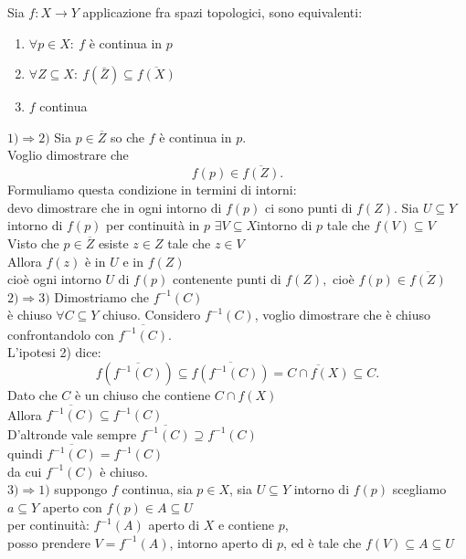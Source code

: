 \documentclass[12px]{article}
\begin{document}
	\begin{teo}
		Sia $f:X \rightarrow Y$ applicazione fra spazi topologici, sono equivalenti:
\begin{enumerate}
	\item $\forall p\in X:\  f$  è continua in $p$
	\item  $\forall Z\subseteq X: \ f(\bar Z)\subseteq \overline {f(X)}$  
	\item $f$ continua
\end{enumerate}
	\end{teo}
	\begin{dimo}
		$1) \Rightarrow 2)$ Sia $p\in \overline Z$ so che  $f$ è continua in $p$.\\
		Voglio dimostrare che 
		 \[
		 f(p)\in \overline{f(Z)}
		.\] 
		Formuliamo questa condizione in termini di intorni:\\
		devo dimostrare che in ogni intorno di $f(p)$ ci sono punti di  $f(Z)$. Sia $U\subseteq Y$ intorno di  $f(p)$ per continuità in $p$ $\exists V\subseteq X$intorno di  $p$ tale che $f(V)\subseteq V$ \\
		Visto che $p\in \overline Z$ esiste  $z\in Z$ tale che $z\in V$\\
		Allora  $f(z)$ è in $U$ e in $f(Z)$\\
		cioè ogni intorno $U$ di $f(p)$ contenente punti di $f(Z),$ cioè $f(p)\in \overline{f(Z)}$\\[10px]
		$2) \Rightarrow 3)$ Dimostriamo che $f^{-1}(C)$\\
		è chiuso  $\forall C\subseteq Y$ chiuso. Considero $f^{-1} (C)$, voglio dimostrare che è chiuso confrontandolo con  $\overline{f^{-1}(C)}$.\\
		L'ipotesi 2) dice:
		 \[
			 f(\overline{f^{-1}(C)})\subseteq\overline{f(f^{-1}(C))} = \overline{C\cap f(X)}\subseteq C
		.\] 
		Dato che $C$ è un chiuso che contiene $C\cap f(X)$\\
		Allora  $\overline{f^{-1}(C)}\subseteq f^{-1}(C)$\\
		D'altronde vale sempre  $\overline{f^{-1}(C)} \supseteq f^{-1}(C)$\\
		quindi  $\overline{f^{-1}(C)}= f^{-1}(C)$\\
		da cui  $f^{-1}(C)$ è chiuso.\\[10px]
		$3) \Rightarrow 1)$ suppongo $f$ continua, sia $p\in X$, sia $U\subseteq Y$ intorno di $f(p)$ scegliamo $a\subseteq Y$ aperto con $f(p)\in A \subseteq U$\\
		per continuità:
		$f^{-1}(A)$ aperto di $X$ e contiene  $p$,\\
		posso prendere  $V = f^{-1}(A)$, intorno aperto di $p$, ed è tale che  $f(V)\subseteq A\subseteq U$\\
	\end{dimo}
\end{document}
